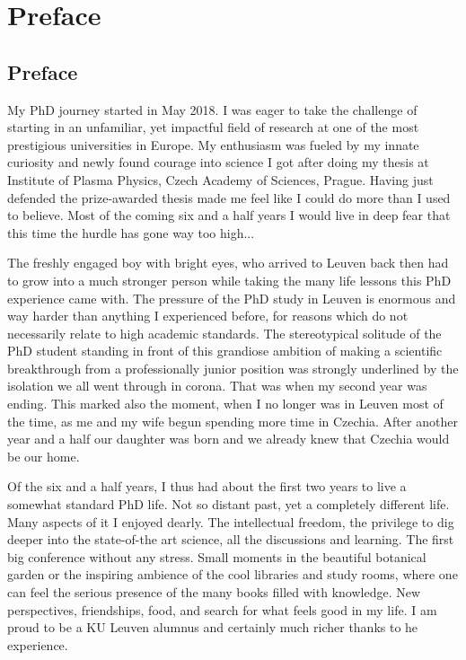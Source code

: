 \chapter*{Preface}                                  \label{ch:preface}
\section*{Preface}
My PhD journey started in May 2018. I was eager to take the challenge of starting in an unfamiliar, yet impactful field of research at one of the most prestigious universities in Europe. My enthusiasm was fueled by my innate curiosity and newly found courage into science I got after doing my thesis at Institute of Plasma Physics, Czech Academy of Sciences, Prague. Having just defended the prize-awarded thesis made me feel like I could do more than I used to believe. Most of the coming six and a half years I would live in deep fear that this time the hurdle has gone way too high...

The freshly engaged boy with bright eyes, who arrived to Leuven back then had to grow into a much stronger person while taking the many life lessons this PhD experience came with. The pressure of the PhD study in Leuven is enormous and way harder than anything I experienced before, for reasons which do not necessarily relate to high academic standards. The stereotypical solitude of the PhD student standing in front of this grandiose ambition of making a scientific breakthrough from a professionally junior position was strongly underlined by the isolation we all went through in corona. That was when my second year was ending. This marked also the moment, when I no longer was in Leuven most of the time, as me and my wife begun spending more time in Czechia. After another year and a half our daughter was born and we already knew that Czechia would be our home.

Of the six and a half years, I thus had about the first two years to live a somewhat standard PhD life. Not so distant past, yet a completely different life. Many aspects of it I enjoyed dearly. The intellectual freedom, the privilege to dig deeper into the state-of-the art science, all the discussions and learning. The first big conference without any stress. Small moments in the beautiful botanical garden or the inspiring ambience of the cool libraries and study rooms, where one can feel the serious presence of the many books filled with knowledge. New perspectives, friendships, food, and search for what feels good in my life. I am proud to be a KU Leuven alumnus and certainly much richer thanks to he experience.

